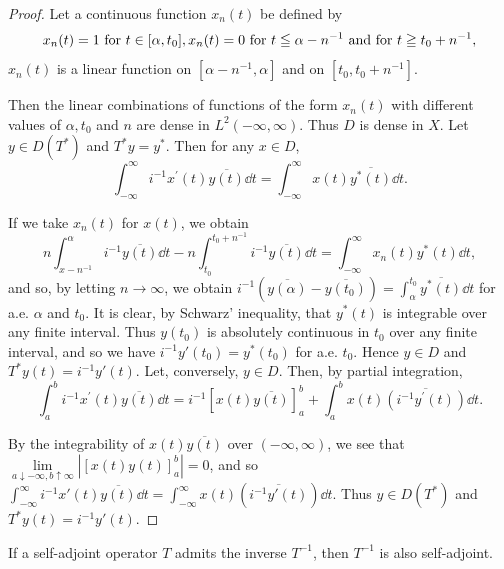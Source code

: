 \begin{proof}
 Let a continuous function $x_{n}(t)$ be defined by 
\begin{equation}x _{n} (t) = 1 \text{ for } t \in [ \alpha , t _{0} ], x _{n} (t) = 0 \text{ for } t \leqq \alpha - n ^{-1} \text{ and for } t \geqq t _{0} + n ^{-1}, \notag\end{equation}
$x_{n}(t)$ is a linear function on $[\alpha - n^{-1}, \alpha]$ and on $[t_0, t_0 + n^{-1}]$. 

Then the linear combinations of functions of the form $x_{n}(t)$ with different values of $\alpha, t_0$ and $n$ are dense in $L^2(-\infty, \infty)$. Thus $D$ is dense in $X$. Let $y \in D(T^*)$ and $T^*y = y^*$. Then for any $x \in D$, 
\[
\int_{- \infty} ^{\infty} i ^{-1} x ^{\prime} (t) \overline {{{y (t)}}} \dd t = \int_{- \infty} ^{\infty} x (t) \overline {{{y ^{*} (t)}}} \dd t.
\]

If we take $x_{n}(t)$ for $x(t)$, we obtain 
\[
n \int_ {x - n ^{-1}} ^{\alpha} i ^{-1} \overline {{{y (t)}}} \dd t - n \int_ {t _{0}} ^ {t _{0} + n ^{-1}} i ^{-1} \overline {{{y (t)}}} \dd t = \int_{- \infty} ^{\infty} x _{n} (t) y ^{*} (t) \dd t,
\]
and so, by letting $n \to \infty$, we obtain $i^{-1}(\overline{y(\alpha)} - \overline{y(t_0)}) = \int_{\alpha}^{t_0} \overline{y^*(t)} \dd t$ for a.e. $\alpha$ and $t_0$. It is clear, by Schwarz' inequality, that $y^*(t)$ is integrable over any finite interval. Thus $y(t_0)$ is absolutely continuous in $t_0$ over any finite interval, and so we have $i^{-1}y'(t_0) = y^*(t_0)$ for a.e. $t_0$. Hence $y \in D$ and $T^*y(t) = i^{-1}y'(t)$. Let, conversely, $y \in D$. Then, by partial integration, 
\[
\int_{a} ^{b} i ^{-1} x ^{\prime} (t) \overline {{{y (t)}}} \dd t = i ^{-1} [ x (t) \overline {{{y (t)}}} ] _{a} ^{b} + \int_{a} ^{b} x (t) \overline {{{(i ^{-1} y ^{\prime} (t))}}} \dd t.
\]

By the integrability of $x(t) \overline{y(t)}$ over $(-\infty, \infty)$, we see that $\lim\limits_{a \downarrow -\infty, b \uparrow \infty} |[x(t)y(t)]_a^b| = 0$, and so $\int_{-\infty}^{\infty} i^{-1} x'(t) \overline{y(t)} \dd t = \int_{-\infty}^{\infty} x(t) (\overline{i^{-1} y'(t)}) \dd t$. Thus $y \in D(T^*)$ and $T^* y(t) = i^{-1} y'(t)$. 
\end{proof}

\begin{theorem}\label{thm:VII.3.Theorem.1} If a self-adjoint operator $T$ admits the inverse $T^{-1}$, then $T^{-1}$ is also self-adjoint. 
\end{theorem}

